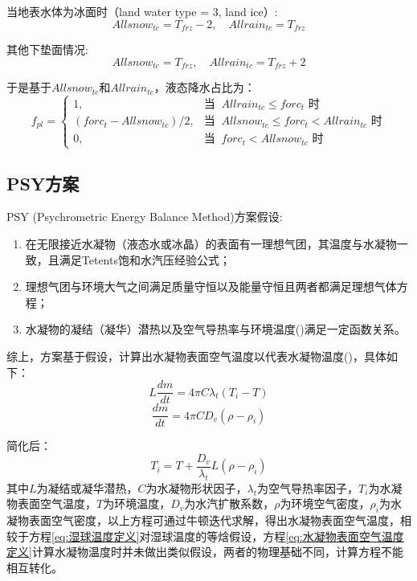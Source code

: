 当地表水体为冰面时（land water type = 3, land ice）:
\begin{equation}
Allsnow_{tc} = T_{frz} - 2,\quad Allrain_{tc} = T_{frz}
\end{equation}

其他下垫面情况:
\begin{equation}
Allsnow_{tc} = T_{frz},\quad Allrain_{tc} = T_{frz} +2
\end{equation}

于是基于$Allsnow_{tc}$和$Allrain_{tc}$，液态降水占比为：
\begin{equation*}
f_{pl}= \begin{cases}
1, & \text{当 }\ Allrain_{tc}\leqslant forc_t \text{ 时}\\
(forc_t - Allsnow_{tc})/2, & \text{当 }\ Allsnow_{tc}\leqslant forc_t < Allrain_{tc} \text{ 时} \\
0, & \text{当 }\ forc_t < Allsnow_{tc} \text{ 时}
\end{cases}
\end{equation*}


\subsection{PSY方案}
PSY (Psychrometric Energy Balance Method)方案假设:
\begin{enumerate}
    \item 在无限接近水凝物（液态水或冰晶）的表面有一理想气团，其温度与水凝物一致，且满足Tetents饱和水汽压经验公式；
    \item 理想气团与环境大气之间满足质量守恒以及能量守恒且两者都满足理想气体方程；
    \item 水凝物的凝结（凝华）潜热以及空气导热率与环境温度(\textcelsius)满足一定函数关系。
\end{enumerate}

综上，方案基于假设，计算出水凝物表面空气温度以代表水凝物温度(\textcelsius)，具体如下：
\begin{equation}
L\frac{dm}{dt}=4\pi C\lambda_t(T_i - T)
\end{equation}
%
\begin{equation}
\frac{dm}{dt}=4\pi CD_v(\rho - \rho_i)
\end{equation}

简化后：
\begin{equation}
\label{eq:水凝物表面空气温度定义}
T_i = T + \frac{D_v}{\lambda_{t}}L(\rho - \rho_i)
\end{equation}
%
其中$L$为凝结或凝华潜热，$C$为水凝物形状因子，$\lambda_t$为空气导热率因子，$T_i$为水凝物表面空气温度，$T$为环境温度，$D_v$为水汽扩散系数，$\rho$为环境空气密度，$\rho_i$为水凝物表面空气密度，以上方程可通过牛顿迭代求解，得出水凝物表面空气温度，相较于方程\ref{eq:湿球温度定义}对湿球温度的等焓假设，方程\ref{eq:水凝物表面空气温度定义}计算水凝物温度时并未做出类似假设，两者的物理基础不同，计算方程不能相互转化。

